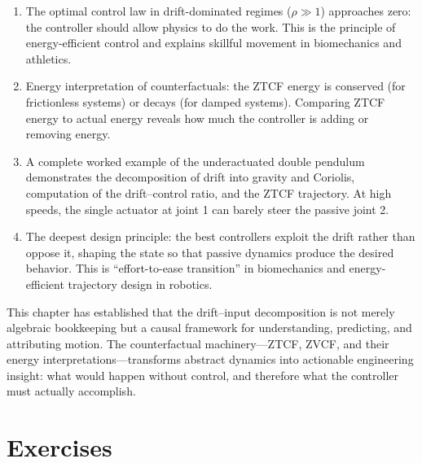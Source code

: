 \begin{enumerate}
\item The optimal control law in drift-dominated regimes ($\rho\gg 1$) approaches zero: the
      controller should allow physics to do the work. This is the principle of energy-efficient
      control and explains skillful movement in biomechanics and athletics.

\item Energy interpretation of counterfactuals: the ZTCF energy is conserved (for frictionless
      systems) or decays (for damped systems). Comparing ZTCF energy to actual energy reveals
      how much the controller is adding or removing energy.

\item A complete worked example of the underactuated double pendulum demonstrates the
      decomposition of drift into gravity and Coriolis, computation of the drift--control ratio,
      and the ZTCF trajectory. At high speeds, the single actuator at joint 1 can barely
      steer the passive joint 2.

\item The deepest design principle: the best controllers exploit the drift rather than oppose
      it, shaping the state so that passive dynamics produce the desired behavior. This is
      ``effort-to-ease transition'' in biomechanics and energy-efficient trajectory design
      in robotics.
\end{enumerate}

This chapter has established that the drift--input decomposition is not merely algebraic bookkeeping but a
causal framework for understanding, predicting, and attributing motion. The counterfactual machinery---ZTCF,
ZVCF, and their energy interpretations---transforms abstract dynamics into actionable engineering insight:
what would happen without control, and therefore what the controller must actually accomplish.

\section*{Exercises}

